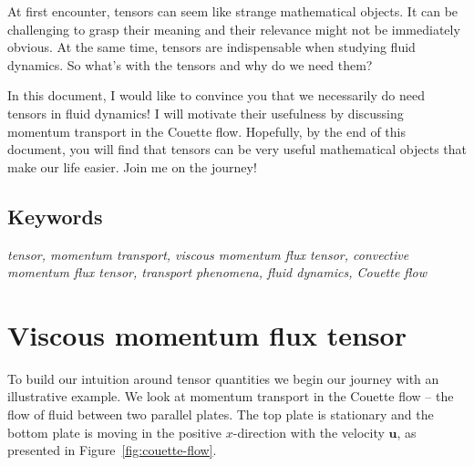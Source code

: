 \documentclass[10pt,twocolumn]{article}
\begin{document}
\small

At first encounter, tensors can seem like strange mathematical objects. It can be challenging to grasp their meaning and their relevance might not be immediately obvious. At the same time, tensors are indispensable when studying fluid dynamics. So what's with the tensors and why do we need them?

In this document, I would like to convince you that we necessarily do need tensors in fluid dynamics! I will motivate their usefulness by discussing momentum transport in the Couette flow. Hopefully, by the end of this document, you will find that tensors can be very useful mathematical objects that make our life easier. Join me on the journey!

\subsection*{Keywords}

\textit{tensor, momentum transport, viscous momentum flux tensor, convective momentum flux tensor, transport phenomena, fluid dynamics, Couette flow}


\section*{Viscous momentum flux tensor}

To build our intuition around tensor quantities we begin our journey with an illustrative example. We look at momentum transport in the Couette flow -- the flow of fluid between two parallel plates. The top plate is stationary and the bottom plate is moving in the positive $x$-direction with the velocity $\mathbf{u}$, as presented in Figure~\ref{fig:couette-flow}.
\end{document}
